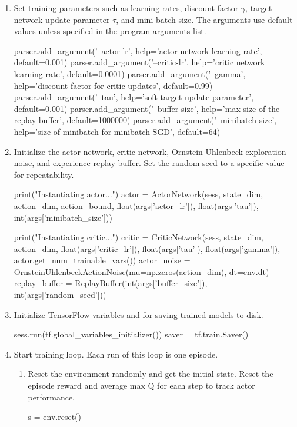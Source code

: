 \begin{enumerate}
\item Set training parameters such as learning rates, discount factor $\gamma$, target network update parameter $\tau$, and mini-batch size. The arguments use default values unless specified in the program arguments list.
\begin{python}[caption={Training Parameter Initialization},label={list:train_param_init},xleftmargin=\dimexpr-\csname @totalleftmargin\endcsname]
parser.add_argument('--actor-lr', help='actor network learning rate', default=0.001) 
parser.add_argument('--critic-lr', help='critic network learning rate', default=0.0001) 
parser.add_argument('--gamma', help='discount factor for critic updates', default=0.99) 
parser.add_argument('--tau', help='soft target update parameter', default=0.001) 
parser.add_argument('--buffer-size', help='max size of the replay buffer', default=1000000)
parser.add_argument('--minibatch-size', help='size of minibatch for minibatch-SGD', default=64)
\end{python}
\item Initialize the actor network, critic network, Ornstein-Uhlenbeck exploration noise, and experience replay buffer. Set the random seed to a specific value for repeatability.
\begin{python}[caption={Network, Noise, and Experience Replay Buffer Initialization},label={list:net_init},xleftmargin=\dimexpr-\csname @totalleftmargin\endcsname]
print("Instantiating actor...")
actor = ActorNetwork(sess, state_dim, action_dim, action_bound,
                     float(args['actor_lr']), float(args['tau']),
                     int(args['minibatch_size']))

print("Instantiating critic...")
critic = CriticNetwork(sess, state_dim, action_dim,
                       float(args['critic_lr']), float(args['tau']),
                       float(args['gamma']),
                       actor.get_num_trainable_vars())
actor_noise = OrnsteinUhlenbeckActionNoise(mu=np.zeros(action_dim), dt=env.dt)
replay_buffer = ReplayBuffer(int(args['buffer_size']), int(args['random_seed']))
\end{python}
\item Initialize TensorFlow variables and  for saving trained models to disk.
\begin{python}[caption={Saver Initialization},label={list:saver_init},xleftmargin=\dimexpr-\csname @totalleftmargin\endcsname]
sess.run(tf.global_variables_initializer())
saver = tf.train.Saver()
\end{python}
\item Start training loop. Each run of this loop is one episode.
	\begin{enumerate}
	\item Reset the environment randomly and get the initial state. Reset the episode reward and average max Q for each step to track actor performance.
	\begin{python}[caption={Episode Reset},label={list:ep_reset},xleftmargin=\dimexpr-\csname @totalleftmargin\endcsname]
s = env.reset()


\end{python}
\end{enumerate}
\end{enumerate}
